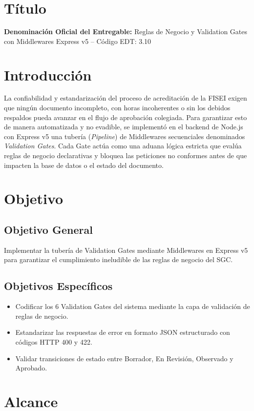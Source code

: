 \documentclass[12pt,a4paper]{article}
\begin{document}
\section{Título}
\textbf{Denominación Oficial del Entregable:} Reglas de Negocio y Validation Gates con Middlewares Express v5 -- Código EDT: 3.10

\section{Introducción}
La confiabilidad y estandarización del proceso de acreditación de la FISEI exigen que ningún documento incompleto, con horas incoherentes o sin los debidos respaldos pueda avanzar en el flujo de aprobación colegiada. Para garantizar esto de manera automatizada y no evadible, se implementó en el backend de Node.js con Express v5 una tubería (\textit{Pipeline}) de Middlewares secuenciales denominados \textit{Validation Gates}. Cada Gate actúa como una aduana lógica estricta que evalúa reglas de negocio declarativas y bloquea las peticiones no conformes antes de que impacten la base de datos o el estado del documento.

\section{Objetivo}
\subsection{Objetivo General}
Implementar la tubería de Validation Gates mediante Middlewares en Express v5 para garantizar el cumplimiento ineludible de las reglas de negocio del SGC.
\subsection{Objetivos Específicos}
\begin{itemize}[leftmargin=1.5em, itemsep=2pt]
    \item Codificar los 6 Validation Gates del sistema mediante la capa de validación de reglas de negocio.
    \item Estandarizar las respuestas de error en formato JSON estructurado con códigos HTTP 400 y 422.
    \item Validar transiciones de estado entre Borrador, En Revisión, Observado y Aprobado.
\end{itemize}

\section{Alcance}
\end{document}
